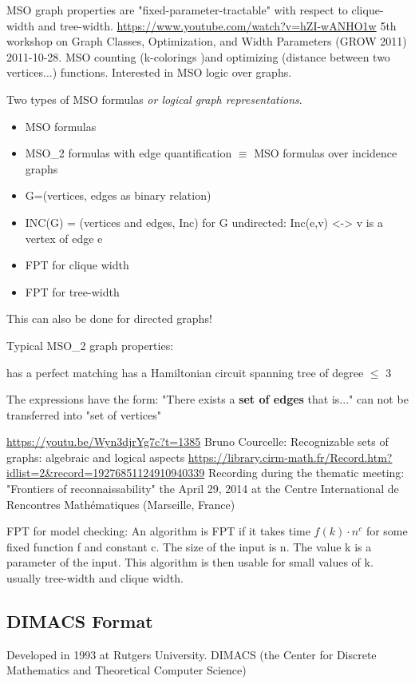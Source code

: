 \documentclass[a4paper, 12pt]{scrartcl}
\begin{document}
MSO graph properties are "fixed-parameter-tractable" with respect to clique-width and tree-width. 
\url{https://www.youtube.com/watch?v=hZI-wANHO1w} 5th workshop on Graph Classes, Optimization, and Width Parameters (GROW 2011)
2011-10-28.
MSO counting (k-colorings )and optimizing (distance between two vertices...) functions.
Interested in MSO logic over graphs.

Two types of MSO formulas \textit{or logical graph representations}.
\begin{itemize}
	\item MSO formulas
	\item MSO_{2} formulas with edge quantification $\equiv$ MSO formulas over incidence graphs
\end{itemize}
\begin{itemize}
	\item G=(vertices, edges as binary relation)
	\item INC(G) = (vertices and edges, Inc)
		for G undirected: Inc(e,v) <-> v is a vertex of edge e
\end{itemize}
\begin{itemize}
	\item FPT for clique width
	\item FPT for tree-width
\end{itemize}
This can also be done for directed graphs!

Typical MSO_{2} graph properties:

has a perfect matching
has a Hamiltonian circuit
spanning tree of degree $\le$ 3

The expressions have the form: "There exists a \textbf{set of edges} that is..." can not be transferred into "set of vertices"

\url{https://youtu.be/Wyn3djrYg7c?t=1385} Bruno Courcelle: Recognizable sets of graphs: algebraic and logical aspects 
\url{https://library.cirm-math.fr/Record.htm?idlist=2&record=19276851124910940339}
Recording during the thematic meeting: "Frontiers of reconnaissability" the April 29, 2014 at the Centre International de Rencontres Mathématiques (Marseille, France)

FPT for model checking:
An algorithm is FPT if it takes time $f(k)\cdot n^{c}$ for some fixed function f and constant c. The size of the input is n. 
The value k is a parameter of the input. 
This algorithm is then usable for small values of k. usually tree-width and clique width.


\subsection{DIMACS Format}
Developed in 1993 at Rutgers University.
DIMACS (the Center for Discrete Mathematics and Theoretical Computer Science)
\end{document}
